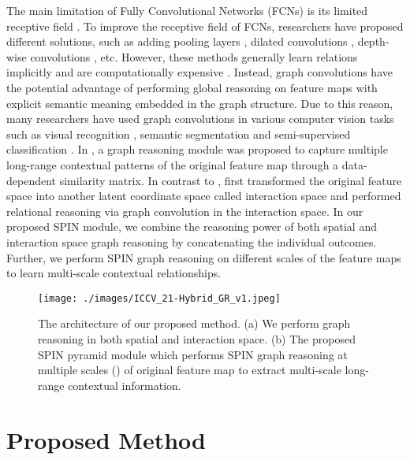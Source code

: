 \documentclass[letterpaper, 10 pt, conference]{ieeeconf}
\begin{document}
  The main limitation of Fully Convolutional Networks (FCNs) is its limited receptive field \cite{araujo2019computing}. To improve the receptive field of FCNs, researchers have proposed different solutions, such as adding pooling layers \cite{araujo2019computing}, dilated convolutions \cite{yu2015multi}, depth-wise convolutions \cite {howard2017mobilenets}, etc. However, these methods generally learn relations implicitly and are computationally expensive \cite{li2020spatial}. Instead, graph convolutions have the potential advantage of performing global reasoning on feature maps with explicit semantic meaning embedded in the graph structure. Due to this reason, many researchers have used graph convolutions in various computer vision tasks such as visual recognition \cite{li2018beyond, liang2018symbolic}, semantic segmentation \cite{chen2019graph, li2020spatial, li2019global} and  semi-supervised classification \cite{kipf2016semi}. In \cite{li2020spatial}, a graph reasoning module was proposed to capture multiple long-range contextual patterns of the original feature map through a data-dependent similarity matrix. In contrast to \cite{li2020spatial}, \cite{chen2019graph}  first  transformed  the original feature space into another latent coordinate space called interaction space and performed relational reasoning via graph convolution in the interaction space. In our proposed SPIN module, we combine the reasoning power of both spatial and interaction space graph reasoning by concatenating the individual outcomes. Further, we perform SPIN graph reasoning on different scales of the feature maps to learn multi-scale contextual relationships. 


\begin{figure}[tb!]
	\centering
	\texttt{[image: ./images/ICCV\_21-Hybrid\_GR\_v1.jpeg]}
    \vskip-10pt
    \caption{The architecture of our proposed method. (a) We perform graph reasoning in both spatial and interaction space. (b) The proposed SPIN pyramid module which performs SPIN graph reasoning at multiple scales () of original feature map to extract multi-scale long-range contextual information.
	\vspace{-5mm}
	}
	\label{SPIN}
\end{figure}
\section{Proposed Method}
\end{document}
